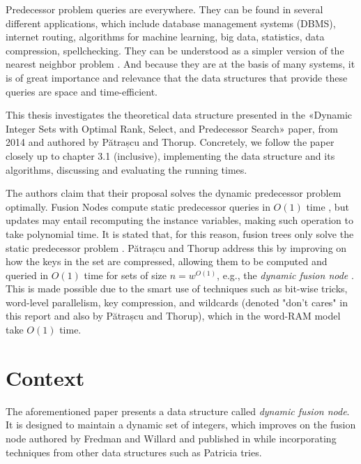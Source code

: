 
Predecessor problem queries are everywhere. They can be found in several different applications, which include database management systems (DBMS), internet routing, algorithms for machine learning, big data, statistics, data compression, spellchecking. They can be understood as a simpler version of the nearest neighbor problem \cite{bille2020massive}. And because they are at the basis of many systems, it is of great importance and relevance that the data structures that provide these queries are space and time-efficient.

This thesis investigates the theoretical data structure presented in the «Dynamic Integer Sets with Optimal Rank, Select, and Predecessor Search» paper, from 2014 and authored by Pătrașcu and Thorup. Concretely, we follow the paper closely up to chapter 3.1 (inclusive), implementing the data structure and its algorithms, discussing and evaluating the running times.

The authors claim that their proposal solves the dynamic predecessor problem optimally.
Fusion Nodes compute static predecessor queries in $O(1)$ time \cite{fredman1993surpassing}, but updates may entail recomputing the instance variables, making such operation to take polynomial time.
It is stated that, for this reason, fusion trees only solve the static predecessor problem \cite{nelsonjelanilec2}.
Pătrașcu and Thorup address this by improving on how the keys in the set are compressed, allowing them to be computed and queried in $O(1)$ time for sets of size $n = w^{O(1)}$, e.g., the \textit{dynamic fusion node} \cite{patrascu2014dynamic}.
This is made possible due to the smart use of techniques such as bit-wise tricks, word-level parallelism, key compression, and wildcards (denoted "don't cares" in this report and also by Pătrașcu and Thorup), which in the word-RAM model take $O(1)$ time.

\section{Context}

The aforementioned paper presents a data structure called \textit{dynamic fusion node}. It is designed to maintain a dynamic set of integers, which improves on the fusion node authored by Fredman and Willard and published in \cite{fredman1993surpassing} while incorporating techniques from other data structures such as Patricia tries.

